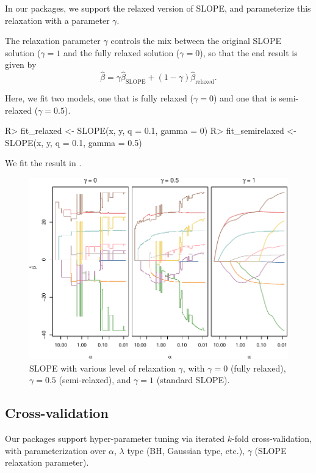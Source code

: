 \documentclass[article]{jss}
\makeatletter
\let\Cref\crtCref
\let\natwidth\Gin@nat@width
\makeatother
\begin{document}
In our packages, we support the relaxed version of SLOPE, and parameterize
this relaxation with a parameter \(\gamma\).

The relaxation parameter \(\gamma\) controls the mix between the
original SLOPE solution (\(\gamma = 1\) and the fully relaxed
solution (\(\gamma = 0\)), so that
the end result is given by
\[
  \hat{\beta} = \gamma \hat{\beta}_\text{SLOPE} + (1 - \gamma) \hat{\beta}_\text{relaxed}.
\]

Here, we fit two models, one that is fully relaxed
(\(\gamma = 0\)) and one that is semi-relaxed (\(\gamma = 0.5\)).

\begin{Code}
R> fit_relaxed <- SLOPE(x, y, q = 0.1, gamma = 0)
R> fit_semirelaxed <- SLOPE(x, y, q = 0.1, gamma = 0.5)
\end{Code}

We fit the result in \Cref{fig:relaxed-slope}.

\begin{figure}[tp]
  \centering
  \includegraphics[width=\natwidth]{images/slope-relaxed.pdf}
  \caption{%
    SLOPE with various level of relaxation \(\gamma\), with
    \(\gamma = 0\) (fully relaxed), \(\gamma = 0.5\) (semi-relaxed),
    and \(\gamma = 1\) (standard SLOPE).
  }
  \label{fig:relaxed-slope}
\end{figure}

\subsection{Cross-validation}

Our packages support hyper-parameter tuning via iterated \(k\)-fold
cross-validation, with parameterization over \(\alpha\), \(\lambda\) type (BH,
Gaussian type, etc.), \(\gamma\) (SLOPE relaxation parameter).
\end{document}
